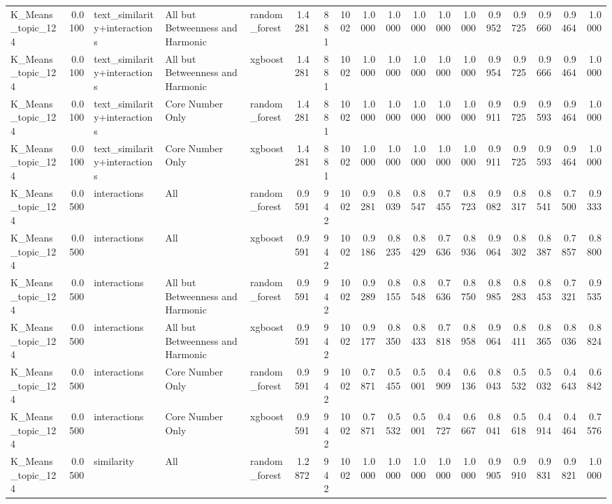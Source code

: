 \begin{tabular}{lrlllrrrrrrrrrrrrr}
K_Means_topic_124 & 0.0100 & text_similarity+interactions & All but Betweenness and Harmonic & random_forest & 1.4281 & 881 & 1002 & 1.0000 & 1.0000 & 1.0000 & 1.0000 & 1.0000 & 0.9952 & 0.9725 & 0.9660 & 0.9464 & 1.0000 \\
K_Means_topic_124 & 0.0100 & text_similarity+interactions & All but Betweenness and Harmonic & xgboost & 1.4281 & 881 & 1002 & 1.0000 & 1.0000 & 1.0000 & 1.0000 & 1.0000 & 0.9954 & 0.9725 & 0.9666 & 0.9464 & 1.0000 \\
K_Means_topic_124 & 0.0100 & text_similarity+interactions & Core Number Only & random_forest & 1.4281 & 881 & 1002 & 1.0000 & 1.0000 & 1.0000 & 1.0000 & 1.0000 & 0.9911 & 0.9725 & 0.9593 & 0.9464 & 1.0000 \\
K_Means_topic_124 & 0.0100 & text_similarity+interactions & Core Number Only & xgboost & 1.4281 & 881 & 1002 & 1.0000 & 1.0000 & 1.0000 & 1.0000 & 1.0000 & 0.9911 & 0.9725 & 0.9593 & 0.9464 & 1.0000 \\
K_Means_topic_124 & 0.0500 & interactions & All & random_forest & 0.9591 & 942 & 1002 & 0.9281 & 0.8039 & 0.8547 & 0.7455 & 0.8723 & 0.9082 & 0.8317 & 0.8541 & 0.7500 & 0.9333 \\
K_Means_topic_124 & 0.0500 & interactions & All & xgboost & 0.9591 & 942 & 1002 & 0.9186 & 0.8235 & 0.8429 & 0.7636 & 0.8936 & 0.9064 & 0.8302 & 0.8387 & 0.7857 & 0.8800 \\
K_Means_topic_124 & 0.0500 & interactions & All but Betweenness and Harmonic & random_forest & 0.9591 & 942 & 1002 & 0.9289 & 0.8155 & 0.8548 & 0.7636 & 0.8750 & 0.8985 & 0.8283 & 0.8453 & 0.7321 & 0.9535 \\
K_Means_topic_124 & 0.0500 & interactions & All but Betweenness and Harmonic & xgboost & 0.9591 & 942 & 1002 & 0.9177 & 0.8350 & 0.8433 & 0.7818 & 0.8958 & 0.9064 & 0.8411 & 0.8365 & 0.8036 & 0.8824 \\
K_Means_topic_124 & 0.0500 & interactions & Core Number Only & random_forest & 0.9591 & 942 & 1002 & 0.7871 & 0.5455 & 0.5001 & 0.4909 & 0.6136 & 0.8043 & 0.5532 & 0.5032 & 0.4643 & 0.6842 \\
K_Means_topic_124 & 0.0500 & interactions & Core Number Only & xgboost & 0.9591 & 942 & 1002 & 0.7871 & 0.5532 & 0.5001 & 0.4727 & 0.6667 & 0.8041 & 0.5618 & 0.4914 & 0.4464 & 0.7576 \\
K_Means_topic_124 & 0.0500 & similarity & All & random_forest & 1.2872 & 942 & 1002 & 1.0000 & 1.0000 & 1.0000 & 1.0000 & 1.0000 & 0.9905 & 0.9910 & 0.9831 & 0.9821 & 1.0000 \\

\end{tabular}
